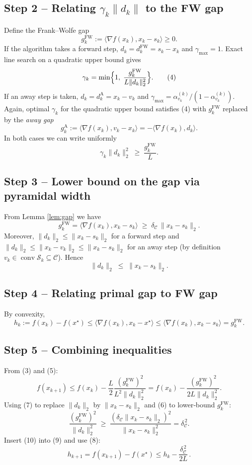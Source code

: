 \documentclass{article}
\begin{document}
\subsection*{Step 2 – Relating $\gamma_k\|d_k\|$ to the FW gap}
Define the Frank–Wolfe gap
\[
g_k^{\text{FW}}:=\langle\nabla f(x_k),x_k-s_k\rangle\ge0.
\]
If the algorithm takes a forward step, $d_k=d^{\text{FW}}_k=s_k-x_k$ and $\gamma_{\max}=1$.  
Exact line search on a quadratic upper bound gives
\[
\gamma_k = \min\Bigl\{1,\; \frac{g_k^{\text{FW}}}{L\|d_k\|_2^2}\Bigr\}. \tag{4}
\]
If an away step is taken, $d_k=d^{\text{A}}_k=x_k-v_k$ and $\gamma_{\max}= \alpha_{v_k}^{(k)}/(1-\alpha_{v_k}^{(k)})$.  
Again, optimal $\gamma_k$ for the quadratic upper bound satisfies (4) with $g_k^{\text{FW}}$ replaced by the \emph{away gap}
\[
g_k^{\text{A}}:=\langle\nabla f(x_k),v_k-x_k\rangle=-\langle\nabla f(x_k),d_k\rangle .
\]
In both cases we can write uniformly
\[
\gamma_k\|d_k\|_2^2 \;\ge\; \frac{g_k^{\text{FW}}}{L}. \tag{5}
\]

\subsection*{Step 3 – Lower bound on the gap via pyramidal width}
From Lemma \ref{lem:gap} we have
\[
g_k^{\text{FW}} = \langle\nabla f(x_k),x_k-s_k\rangle \;\ge\; \delta_{\mathcal{C}}\,\|x_k-s_k\|_2 . \tag{6}
\]
Moreover, $\|d_k\|_2\le\|x_k-s_k\|_2$ for a forward step and $\|d_k\|_2\le\|x_k-v_k\|_2\le\|x_k-s_k\|_2$ for an away step (by definition $v_k\in\operatorname{conv}\mathcal{S}_k\subseteq\mathcal{C}$). Hence
\[
\|d_k\|_2 \;\le\; \|x_k-s_k\|_2 . \tag{7}
\]

\subsection*{Step 4 – Relating primal gap to FW gap}
By convexity,
\[
h_k:=f(x_k)-f(x^\star)\le \langle\nabla f(x_k),x_k-x^\star\rangle\le \langle\nabla f(x_k),x_k-s_k\rangle = g_k^{\text{FW}}. \tag{8}
\]

\subsection*{Step 5 – Combining inequalities}
From (3) and (5):
\[
f(x_{k+1})\le f(x_k)-\frac{L}{2}\frac{(g_k^{\text{FW}})^2}{L^2\|d_k\|_2^2}
= f(x_k)-\frac{(g_k^{\text{FW}})^2}{2L\|d_k\|_2^2}. \tag{9}
\]
Using (7) to replace $\|d_k\|_2$ by $\|x_k-s_k\|_2$ and (6) to lower‑bound $g_k^{\text{FW}}$:
\[
\frac{(g_k^{\text{FW}})^2}{\|d_k\|_2^2}
\;\ge\;
\frac{(\delta_{\mathcal{C}}\|x_k-s_k\|_2)^2}{\|x_k-s_k\|_2^2}
= \delta_{\mathcal{C}}^{\,2}. \tag{10}
\]
Insert (10) into (9) and use (8):
\[
h_{k+1}=f(x_{k+1})-f(x^\star)
\le h_k-\frac{\delta_{\mathcal{C}}^{\,2}}{2L}\, . \tag{11}
\]
\end{document}
